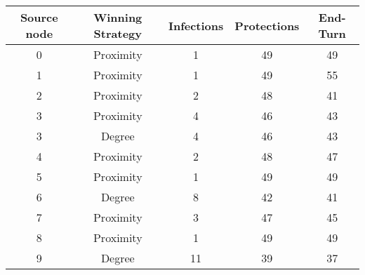 \documentclass[results.tex]{subfiles}
\begin{document}
    \begin{center}
        \begin{tabular}{| c || c | c | c | c |}
            \hline
            {\bfseries Source node} & {\bfseries Winning Strategy} & {\bfseries Infections} & {\bfseries Protections}
            & {\bfseries End-Turn}
            \\  %
            \hline\hline
            0                       & Proximity                    & 1                      & 49                      & 49                   \\
            \hline
            1                       & Proximity                    & 1                      & 49                      & 55                   \\
            \hline
            2                       & Proximity                    & 2                      & 48                      & 41                   \\
            \hline
            3                       & Proximity                    & 4                      & 46                      & 43                   \\
            \hline
            3                       & Degree                       & 4                      & 46                      & 43                   \\
            \hline
            4                       & Proximity                    & 2                      & 48                      & 47                   \\
            \hline
            5                       & Proximity                    & 1                      & 49                      & 49                   \\
            \hline
            6                       & Degree                       & 8                      & 42                      & 41                   \\
            \hline
            7                       & Proximity                    & 3                      & 47                      & 45                   \\
            \hline
            8                       & Proximity                    & 1                      & 49                      & 49                   \\
            \hline
            9                       & Degree                       & 11                     & 39                      & 37                   \\

\end{tabular}
\end{center}
\end{document}
